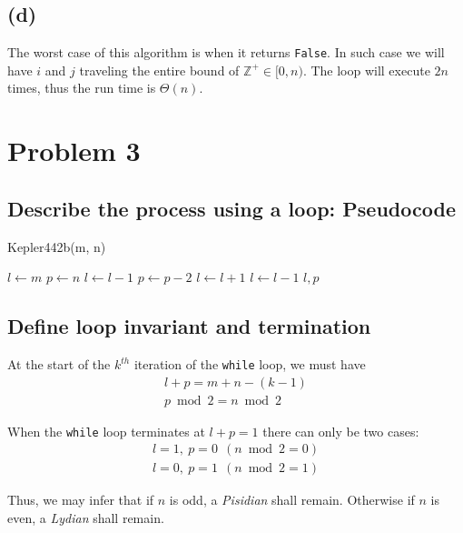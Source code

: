 \documentclass[12pt]{article}
\newcommand{\inlinecode}{\texttt}
\begin{document}
\subsection{(d)}
The worst case of this algorithm is when it returns \inlinecode{False}. In such case we will have $i$ and $j$ traveling the entire bound of $\mathbb{Z^+} \in [0, n)$. The loop will execute $2n$ times, thus the run time is $\Theta(n)$.

\section{Problem 3}
\subsection{Describe the process using a loop: Pseudocode}

\begin{algorithm}
\caption{Kepler442b(m, n)}\label{Kepler442b}
\begin{algorithmic}[1]
\Procedure{}{}
\State $l \gets m$
\State $p \gets n$
    \State {}
        \State $l \gets l - 1$
        \State $p \gets p - 2$
        \State $l \gets l + 1$
    \Else
        \State $l \gets l - 1$
    \EndIf
\EndWhile
\State \Return $l, p$
\EndProcedure
\end{algorithmic}
\end{algorithm}

\subsection{Define loop invariant and termination}
At the start of the $k^{th}$ iteration of the \inlinecode{while} loop, we must have
\begin{gather}
    l + p = m + n - (k - 1) \\
    p\bmod 2 = n \bmod 2
\end{gather}

When the \inlinecode{while} loop terminates at $l + p = 1$ there can only be two cases:
\begin{gather}
    l = 1, \ p = 0 \ \ (n \bmod 2 = 0) \\
    l = 0, \ p = 1 \ \ (n \bmod 2 = 1)
\end{gather}

Thus, we may infer that if $n$ is odd, a \textit{Pisidian} shall remain. Otherwise if $n$ is even, a \textit{Lydian} shall remain.
\end{document}
